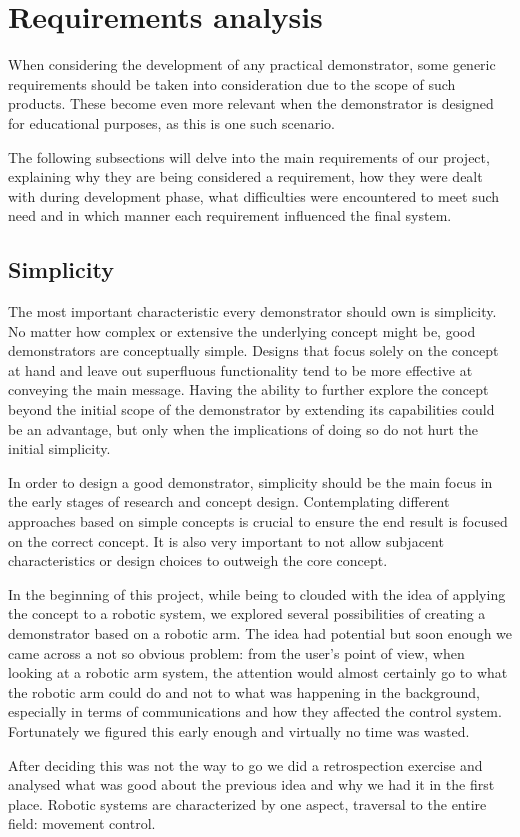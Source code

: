 \section{Requirements analysis} \label{sec:requirements}


When considering the development of any practical demonstrator, some generic requirements should be taken into consideration due to the scope of such products.
These become even more relevant when the demonstrator is designed for educational purposes, as this is one such scenario.

The following subsections will delve into the main requirements of our project, explaining why they are being considered a requirement, how they were dealt with during development phase, what difficulties were encountered to meet such need and in which manner each requirement influenced the final system.

\subsection{Simplicity}
The most important characteristic every demonstrator should own is simplicity.
No matter how complex or extensive the underlying concept might be, good demonstrators are conceptually simple.
Designs that focus solely on the concept at hand and leave out superfluous functionality tend to be more effective at conveying the main message.
Having the ability to further explore the concept beyond the initial scope of the demonstrator by extending its capabilities could be an advantage, but only when the implications of doing so do not hurt the initial simplicity.

In order to design a good demonstrator, simplicity should be the main focus in the early stages of research and concept design.
Contemplating different approaches based on simple concepts is crucial to ensure the end result is focused on the correct concept.
It is also very important to not allow subjacent characteristics or design choices to outweigh the core concept.

In the beginning of this project, while being to clouded with the idea of applying the concept to a robotic system, we explored several possibilities of creating a demonstrator based on a robotic arm.
The idea had potential but soon enough we came across a not so obvious problem: from the user's point of view, when looking at a robotic arm system, the attention would almost certainly go to what the robotic arm could do and not to what was happening in the background, especially in terms of communications and how they affected the control system.
Fortunately we figured this early enough and virtually no time was wasted.

After deciding this was not the way to go we did a retrospection exercise and analysed what was good about the previous idea and why we had it in the first place.
Robotic systems are characterized by one aspect, traversal to the entire field: movement control.


